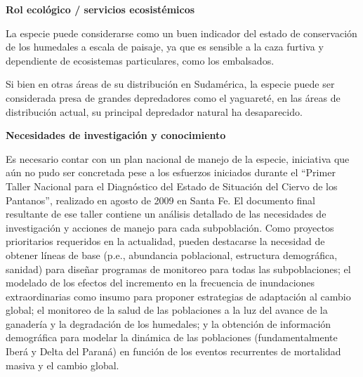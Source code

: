 \documentclass[
  x11names]{article}
\begin{document}
\textbf{Rol ecológico / servicios ecosistémicos}

La especie puede considerarse como un buen indicador del estado de
conservación de los humedales a escala de paisaje, ya que es sensible a
la caza furtiva y dependiente de ecosistemas particulares, como los
embalsados.

Si bien en otras áreas de su distribución en Sudamérica, la especie
puede ser considerada presa de grandes depredadores como el yaguareté,
en las áreas de distribución actual, su principal depredador natural ha
desaparecido.

\textbf{Necesidades de investigación y conocimiento}

Es necesario contar con un plan nacional de manejo de la especie,
iniciativa que aún no pudo ser concretada pese a los esfuerzos iniciados
durante el ``Primer Taller Nacional para el Diagnóstico del Estado de
Situación del Ciervo de los Pantanos'', realizado en agosto de 2009 en
Santa Fe. El documento final resultante de ese taller contiene un
análisis detallado de las necesidades de investigación y acciones de
manejo para cada subpoblación. Como proyectos prioritarios requeridos en
la actualidad, pueden destacarse la necesidad de obtener líneas de base
(p.e., abundancia poblacional, estructura demográfica, sanidad) para
diseñar programas de monitoreo para todas las subpoblaciones; el
modelado de los efectos del incremento en la frecuencia de inundaciones
extraordinarias como insumo para proponer estrategias de adaptación al
cambio global; el monitoreo de la salud de las poblaciones a la luz del
avance de la ganadería y la degradación de los humedales; y la obtención
de información demográfica para modelar la dinámica de las poblaciones
(fundamentalmente Iberá y Delta del Paraná) en función de los eventos
recurrentes de mortalidad masiva y el cambio global.


%
\begin{table}[H]
\centering
\begin{tabular}[t]{>{\raggedright\arraybackslash}m{16cm}>{}m{16cm}}
\toprule
\cellcolor{ceil}{\textcolor{white}{\textbf{\rule{0pt}{14pt}BIBLIOGRAFÍA}}}\\
\bottomrule
\end{tabular}
\end{table}

\vspace{-0.4cm}
\end{document}
